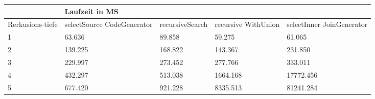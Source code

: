 \begin{table}[H]
	\begin{tabular}{l|l|l|l|l|l|}
		\cline{2-6}
		& \multicolumn{5}{|l|}{Laufzeit in MS}                                                                                                                                                  \\ \hline
		\multicolumn{1}{|l|}{\multirow{2}{2cm}{Rerkusions-tiefe}} & \multicolumn{2}{|l|}{\multirow{2}{3cm}{selectSource CodeGenerator}} & \multirow{2}{2.8cm}{recursiveSearch} & \multirow{2}{2.5cm}{recursive WithUnion} & \multirow{2}{2.5cm}{selectInner JoinGenerator} \\
		\multicolumn{1}{|l|}{}
		& \multicolumn{2}{|l|}{}                                           &                                  &                                     &                                           \\ \hline
	\multicolumn{1}{|l|}{1}               & \multicolumn{2}{l|}{63.636}                                     & 89.858                           & 59.275                              & 61.065                                    \\ \hline
	\multicolumn{1}{|l|}{2}               & \multicolumn{2}{l|}{139.225}                                    & 168.822                          & 143.367                             & 231.850                                   \\ \hline
	\multicolumn{1}{|l|}{3}               & \multicolumn{2}{l|}{229.997}                                    & 273.452                          & 277.766                             & 333.011                                   \\ \hline
	\multicolumn{1}{|l|}{4}               & \multicolumn{2}{l|}{432.297}                                    & 513.038                          & 1664.168                            & 17772.456                                 \\ \hline
	\multicolumn{1}{|l|}{5}               & \multicolumn{2}{l|}{677.420}                                    & 921.228                          & 8335.513                            & 81241.284                                 \\ \hline
	
	\end{tabular}
\end{table}
